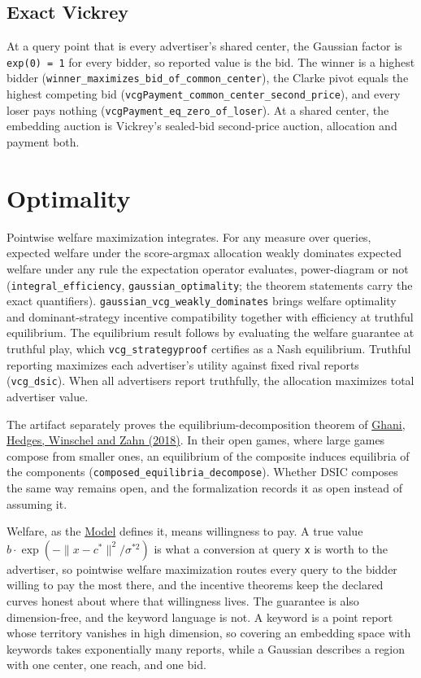 \subsection{Exact Vickrey}\label{exact-vickrey}

At a query point that is every advertiser's shared center, the Gaussian
factor is \texttt{exp(0)\ =\ 1} for every bidder, so reported value is
the bid. The winner is a highest bidder
(\texttt{winner\_maximizes\_bid\_of\_common\_center}), the Clarke pivot
equals the highest competing bid
(\texttt{vcgPayment\_common\_center\_second\_price}), and every loser
pays nothing (\texttt{vcgPayment\_eq\_zero\_of\_loser}). At a shared
center, the embedding auction is Vickrey's sealed-bid second-price
auction, allocation and payment both.

\section{Optimality}\label{optimality}

Pointwise welfare maximization integrates. For any measure over queries,
expected welfare under the score-argmax allocation weakly dominates
expected welfare under any rule the expectation operator evaluates,
power-diagram or not (\texttt{integral\_efficiency},
\texttt{gaussian\_optimality}; the theorem statements carry the exact
quantifiers). \texttt{gaussian\_vcg\_weakly\_dominates} brings welfare
optimality and dominant-strategy incentive compatibility together with
efficiency at truthful equilibrium. The equilibrium result follows by
evaluating the welfare guarantee at truthful play, which
\texttt{vcg\_strategyproof} certifies as a Nash equilibrium. Truthful
reporting maximizes each advertiser's utility against fixed rival
reports (\texttt{vcg\_dsic}). When all advertisers report truthfully,
the allocation maximizes total advertiser value.

The artifact separately proves the equilibrium-decomposition theorem of
\href{https://arxiv.org/abs/1603.04641}{Ghani, Hedges, Winschel and Zahn
(2018)}. In their open games, where large games compose from smaller
ones, an equilibrium of the composite induces equilibria of the
components (\texttt{composed\_equilibria\_decompose}). Whether DSIC
composes the same way remains open, and the formalization records it as
open instead of assuming it.

Welfare, as the \hyperref[model]{Model} defines it, means willingness to
pay. A true value \(b \cdot  \exp(-\|x-c^{*}\|^{2}/\sigma ^{*2})\) is
what a conversion at query \texttt{x} is worth to the advertiser, so
pointwise welfare maximization routes every query to the bidder willing
to pay the most there, and the incentive theorems keep the declared
curves honest about where that willingness lives. The guarantee is also
dimension-free, and the keyword language is not. A keyword is a point
report whose territory vanishes in high dimension, so covering an
embedding space with keywords takes exponentially many reports, while a
Gaussian describes a region with one center, one reach, and one bid.

